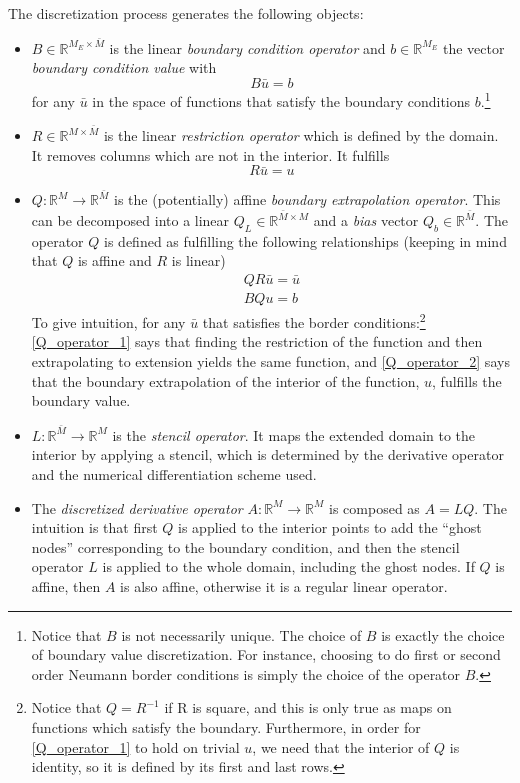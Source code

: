 \documentclass[11pt]{article}
\newcommand{\R}{\ensuremath{\mathbb{R}}}
\begin{document}
	The discretization process generates the following objects:
	\begin{itemize}
		\item $B\in \R^{M_E \times \bar{M}}$ is the linear \textit{boundary condition operator} and $b \in \R^{M_E}$ the vector \textit{boundary condition value} with
		\begin{equation}
		B \bar{u} = b
		\label{B_operator_block}
		\end{equation}
		for any $\bar{u}$ in the space of functions that satisfy the boundary conditions $b$.\footnote{
Notice that $B$ is not necessarily unique. The choice of $B$ is exactly the choice of boundary value discretization. For instance, choosing to do first or second order Neumann border conditions is simply the choice of the operator $B$.}
		\item $R\in \R^{M\times \bar{M}}$ is the linear \textit{restriction operator} which is defined by the domain. It removes columns which are not in the interior. It fulfills
		\begin{equation}
		R \bar{u} = u \label{R_operator}
		\end{equation}

		\item $Q : \R^M \to \R^{\bar{M}}$ is the (potentially) affine \textit{boundary extrapolation operator}.  This can be decomposed into a linear $Q_L \in \R^{\bar{M}\times M}$ and a \textit{bias} vector $Q_b \in \R^{\bar{M}}$.  The operator $Q$ is defined as fulfilling the following relationships (keeping in mind that $Q$ is affine and $R$ is linear)
		\begin{align}
		Q  R\bar{u} = \bar{u}\label{Q_operator_1}\\
		B Q u  = b	\label{Q_operator_2}
		\end{align}
		To give intuition, for any $\bar{u}$ that satisfies the border conditions:\footnote{Notice that $Q = R^{-1}$ if R is square, and this is only true as maps on functions which satisfy the boundary.  Furthermore, in order for \cref{Q_operator_1} to hold on trivial $u$, we need that the interior of $Q$ is identity, so it is defined by its first and last rows.} \cref{Q_operator_1} says that finding the restriction of the function and then extrapolating to extension yields the same function, and \cref{Q_operator_2} says that the boundary extrapolation of the interior of the function, $u$, fulfills the boundary value.
		\item $L : \R^{\bar{M}} \to \R^M$ is the \textit{stencil operator}. It maps the extended domain to the interior by applying a stencil, which is determined by the derivative operator and the numerical differentiation scheme used.
		\item The \textit{discretized derivative operator} $A : \R^M \to \R^M$ is composed as $A = LQ$. The intuition is that first $Q$ is applied to the interior points to add the ``ghost nodes'' corresponding to the boundary condition, and then the stencil operator $L$ is applied to the whole domain, including the ghost nodes. If $Q$ is affine, then $A$ is also affine, otherwise it is a regular linear operator.
	\end{itemize}
	
\end{document}

